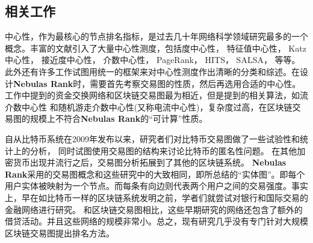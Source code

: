 \subsection{相关工作} \label{subsec:related}
中心性，作为最核心的节点排名指标，是过去几十年网络科学领域研究最多的一个概念\cite{newman2010networks}。丰富的文献引入了大量中心性测度，包括度中心性\cite{freeman1979set}， 特征值中心性\cite{bonacich1972factoring}， Katz中心性\cite{katz1953new}， 接近度中心性\cite{sabidussi1966centrality}， 介数中心性\cite{freeman1977set}\cite{freeman1978centrality}\cite{freeman1991centrality}\cite{noh2004random}\cite{newman2005measure}， PageRank\cite{Brin2010}， HITS\cite{kleinberg1999authoritative}， SALSA\cite{Science2001}， 等等。此外还有许多工作试图用统一的框架来对中心性测度作出清晰的分类和综述\cite{Borgatti2005}\cite{Borgatti2006}\cite{Lu2016}。在设计\textbf{Nebulas Rank}时，需要首先考察交易图的性质，然后再选用合适的中心性。\textcite{Borgatti2005}工作中提到的资金交换网络和区块链交易图最为相近，但是提到的相关算法，如流介数中心性\cite{freeman1991centrality} 和随机游走介数中心性(又称电流中心性)\cite{newman2005measure}，复杂度过高，在区块链交易图的规模上不符合\textbf{Nebulas Rank}的“可计算”性质。

自从比特币\cite{Nakamoto2008}系统在2009年发布以来，研究者们对比特币交易图做了一些试验性和统计上的分析\cite{Ron}\cite{Haslhofer}\cite{NielKondor2014}\cite{Baumann2014}， 同时试图使用交易图的结构来讨论比特币的匿名性问题\cite{Meiklejohn2013}\cite{Ober2013}\cite{pham2016anomaly}\cite{Fleder2015}\cite{Ferrin2015}。 在其他加密货币出现并流行之后，交易图分析拓展到了其他的区块链系统\cite{Chang2017}\cite{Anderson2016}。 \textbf{Nebulas Rank}采用的交易图概念和这些研究中的大致相同，即\textcite{Tschorsch2015}所总结的“实体图”。即每个用户实体被映射为一个节点。而每条有向边则代表两个用户之间的交易强度。事实上，早在如比特币一样的区块链系统发明之前，学者们就尝试对银行和国际交易的金融网络进行研究\cite{propper2008towards}\cite{Boss2004}\cite{Serrano2007}\cite{Bech2008}\cite{Fagiolo2009}\cite{Morten2006}\cite{Boss2004a}\cite{Krempel2002}\cite{Serrano2003}。 和区块链交易图相比，这些早期研究的网络还包含了额外的借贷活动。并且这些网络的规模非常小。总之，现有研究几乎没有专门针对大规模区块链交易图提出排名方法。

